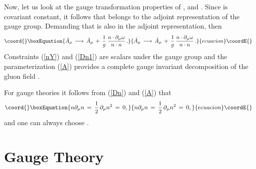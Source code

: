 \documentclass[a4paper,a4paper]{article}
\begin{document}
Now, let us look at the gauge transformation properties of \coordHE{}, \coordHE{} and 
\coordHE{}. Since \coordHE{} is covariant constant, it follows that 
\coordHE{} belongs to the adjoint representation of the gauge group. 
Demanding that \coordHE{} is also in the adjoint representation, then
\begin{equation}\coord{}\boxEquation{
   \hat{A}_\mu \, \longrightarrow \, \hat{A}_\mu \, + \,
                                     \frac{1}{g} \, 
                                         \frac{n \cdot \partial_\mu \omega}
                                              {n \cdot n} \, .
}{
   \hat{A}_\mu \, \longrightarrow \, \hat{A}_\mu \, + \,
                                     \frac{1}{g} \, 
                                         \frac{n \cdot \partial_\mu \omega}
                                              {n \cdot n} \, .
}{ecuacion}\coordE{}\end{equation}
Constraints (\ref{nY}) and (\ref{Dn1}) are scalars under the gauge group and
the parameterization (\ref{A}) provides a complete gauge invariant 
decomposition of the gluon field \coordHE{}.

For \coordHE{} gauge theories it follows from (\ref{Dn}) and (\ref{A}) that
\begin{equation}\coord{}\boxEquation{
    n \partial_\mu n \, = \, \frac{1}{2} \, \partial_\mu n^2 \, = \, 0,
   \label{t1}
}{
    n \partial_\mu n \, = \, \frac{1}{2} \, \partial_\mu n^2 \, = \, 0,
   }{ecuacion}\coordE{}\end{equation}
and one can always choose \coordHE{}.


\section{\coordHE{} Gauge Theory}
\end{document}
